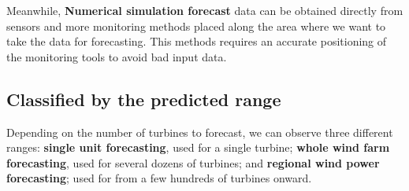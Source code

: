 Meanwhile, \textbf{Numerical simulation forecast} data can be obtained directly from sensors and more monitoring methods placed along the area where we want to take the data for forecasting. This methods requires an accurate positioning of the monitoring tools to avoid bad input data.

\subsection{Classified by the predicted range}

Depending on the number of turbines to forecast, we can observe three different ranges: \textbf{single unit forecasting}, used for a single turbine; \textbf{whole wind farm forecasting}, used for several dozens of turbines; and \textbf{regional wind power forecasting}; used for from a few hundreds of turbines onward.